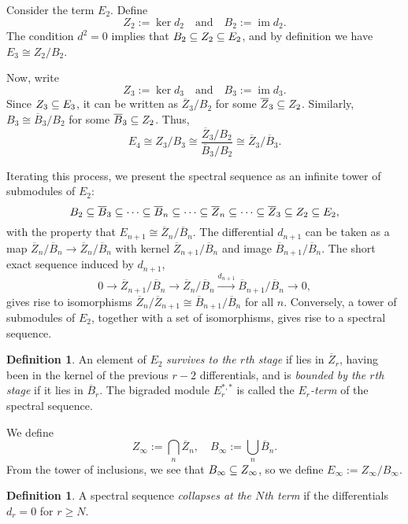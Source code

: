 \documentclass[11pt, titlepage]{article} %
\def\subq{\ensuremath\subseteq}
\DeclareMathOperator{\im}{im}
\numberwithin{equation}{subsection}
\theoremstyle{plain}
\theoremstyle{definition}
\newtheorem{definition}[theorem]{Definition}
\begin{document}
Consider the term \(E_2\). Define 
\[Z_2:=\ker d_2 \quad \text{and} \quad B_2:=\im d_2.\]
The condition \(d^2=0\) implies that \(B_2\subq Z_2\subq E_2\), and by definition we have \(E_3\cong Z_2/B_2\). 

Now, write 
\[Z_3:=\ker d_3 \quad \text{and} \quad B_3:=\im d_3.\]
Since \(Z_3\subq E_3\), it can be written as \(\overline{Z}_3/B_2\) for some \(\overline{Z}_3\subq Z_2\). Similarly, \(B_3\cong \overline B_3/B_2\) for some \(\overline B_3\subq Z_2\). Thus,
\[E_4\cong Z_3/B_3\cong \frac{\overline Z_3/B_2}{\overline B_3/B_2}\cong \overline Z_3/\overline B_3.\]

Iterating this process, we present the spectral sequence as an infinite tower of submodules of \(E_2\):
\[B_2\subq \overline B_3\subq \cdots \subq \overline B_n\subq \cdots \subq \overline Z_n\subq \cdots \subq \overline Z_3\subq Z_2\subq E_2,\]
with the property that \(E_{n+1}\cong \overline Z_n/\overline B_n\). The differential \(d_{n+1}\) can be taken as a map \(\overline Z_n/\overline B_n\to\overline Z_n/\overline B_n\) with kernel \(\overline Z_{n+1}/\overline B_n\) and image \(\overline B_{n+1}/\overline B_n\). The short exact sequence induced by \(d_{n+1}\),
\[0 \to \overline Z_{n+1}/\overline B_n\to \overline Z_n/\overline B_n \xrightarrow{d_{n+1}} \overline B_{n+1}/\overline{B}_n\to 0,\]
gives rise to isomorphisms \(\overline{Z}_n/\overline{Z}_{n+1}\cong \overline{B}_{n+1}/\overline{B}_n\) for all \(n\). Conversely, a tower of submodules of \(E_2\), together with a set of isomorphisms, gives rise to a spectral sequence. 

\begin{definition}
An element of \(E_2\) \textit{survives to the \(r\)th stage} if lies in \(\overline{Z}_r\), having been in the kernel of the previous \(r-2\) differentials, and is \textit{bounded by the \(r\)th stage} if it lies in \(\overline{B}_r\). The bigraded module \(E_r^{*,*}\) is called the \textit{\(E_r\)-term} of the spectral sequence. 
\end{definition}

We define 
\[Z_\infty:= \bigcap_n \overline{Z}_n, \quad B_\infty:=\bigcup_n \overline{B}_n.\]
From the tower of inclusions, we see that \(B_\infty\subq Z_\infty\), so we define \(E_\infty:=Z_\infty/B_\infty\). 

\begin{definition}
A spectral sequence \textit{collapses at the \(N\)th term} if the differentials \(d_r=0\) for \(r\geq N\). 
\end{definition}
\end{document}
